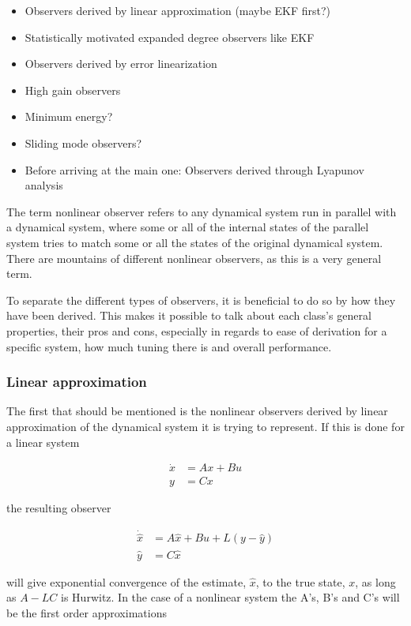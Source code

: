 \begin{itemize}
    \item Observers derived by linear approximation (maybe EKF first?)
    \item Statistically motivated expanded degree observers like EKF
    \item Observers derived by error linearization
    \item High gain observers
    \item Minimum energy?
    \item Sliding mode observers?
    \item Before arriving at the main one: Observers derived through Lyapunov analysis
\end{itemize}
\fi

The term nonlinear observer refers to any dynamical system run in parallel with a dynamical system, where some or all of the internal states of the parallel system tries to match some or all the states of the original dynamical system. There are mountains of different nonlinear observers, as this is a very general term. 

To separate the different types of observers, it is beneficial to do so by how they have been derived. This makes it possible to talk about each class's general properties, their pros and cons, especially in regards to ease of derivation for a specific system, how much tuning there is and overall performance.

\subsubsection{Linear approximation}

The first that should be mentioned is the nonlinear observers derived by linear approximation of the dynamical system it is trying to represent\cite{LinearizingNonlinObs}. If this is done for a linear system 

\begin{align}
    \Dot{x} &= Ax + Bu \\
    y &= Cx
\end{align}

the resulting observer

\begin{align}
    \Dot{\hat{x}} &= A\hat{x} + Bu + L(y - \hat{y}) \\
    \hat{y} &= C\hat{x}
\end{align}

will give exponential convergence of the estimate, $\hat{x}$, to the true state, $x$, as long as $A-LC$ is Hurwitz\cite{Hurwitz}. In the case of a nonlinear system the A's, B's and C's will be the first order approximations

